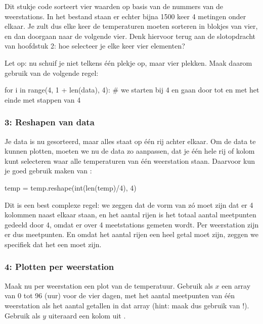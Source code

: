\documentclass[a4paper,11pt, fleqn]{article}
\begin{document}
Dit stukje code sorteert vier waarden op basis van de nummers van de weerstations. In het bestand staan er echter bijna 1500 keer 4 metingen onder elkaar. Je zult dus elke keer de temperaturen moeten sorteren in blokjes van vier, en dan doorgaan naar de volgende vier. Denk hiervoor terug aan de slotopdracht van hoofdstuk 2: hoe selecteer je elke keer vier elementen?

Let op: nu schuif je niet telkens één plekje op, maar vier plekken. Maak daarom gebruik van de volgende regel:

\begin{python}
for i in range(4, 1 + len(data), 4):
# we starten bij 4 en gaan door tot en met het einde met stappen van 4
\end{python}

\subsubsection*{3: Reshapen van data}
Je data is nu gesorteerd, maar alles staat op \'e\'en rij achter elkaar. Om de data te kunnen plotten, moeten we nu de data zo aanpassen, dat je \'e\'en hele rij of kolom kunt selecteren waar alle temperaturen van \'e\'en weerstation staan. Daarvoor kun je goed gebruik maken van :

\begin{python}
temp = temp.reshape(int(len(temp)/4), 4)
\end{python}

Dit is een best complexe regel: we zeggen dat de vorm van  z\'o moet zijn dat er 4 kolommen naast elkaar staan, en het aantal rijen is het totaal aantal meetpunten gedeeld door 4, omdat er over 4 meetstations gemeten wordt. Per weerstation zijn er dus  meetpunten. En omdat het aantal rijen een heel getal moet zijn, zeggen we specifiek dat het een  moet zijn.

\subsubsection*{4: Plotten per weerstation}
Maak nu per weerstation een plot van de temperatuur. Gebruik als $x$ een array van 0 tot 96 (uur) voor de vier dagen, met het aantal meetpunten van \'e\'en weerstation als het aantal getallen in dat array (hint: maak dus gebruik van !). Gebruik als $y$ uiteraard een kolom uit .
\end{document}

